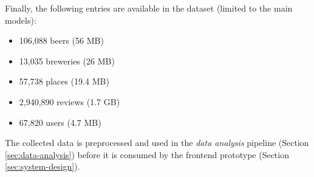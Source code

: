 Finally, the following entries are available in the dataset (limited to the main models):
\begin{itemize}
    \item 106,088 beers (56 MB)
    \item 13,035 breweries (26 MB)
    \item 57,738 places (19.4 MB)
    \item 2,940,890 reviews (1.7 GB)
    \item 67,820 users (4.7 MB)
\end{itemize}
The collected data is preprocessed and used in the \textit{data analysis} pipeline (Section \ref{sec:data-analysis}) before it is consumed by the frontend prototype (Section \ref{sec:system-design}).